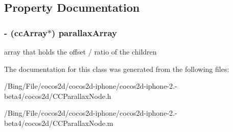 \subsection{Property Documentation}
\hypertarget{interface_c_c_parallax_node_ac06bed34e14b62be16a10fd9939eedc8}{
\subsubsection[{parallax\-Array}]{\setlength{\rightskip}{0pt plus 5cm}-\/ ({\bf cc\-Array}$\ast$) {\bf parallax\-Array}}}\label{interface_c_c_parallax_node_ac06bed34e14b62be16a10fd9939eedc8}
array that holds the offset / ratio of the children 

The documentation for this class was generated from the following files\-:\begin{DoxyCompactItemize}
\item 
/\-Bing/\-File/cocos2d/cocos2d-\/iphone/cocos2d-\/iphone-\/2.-\/beta4/cocos2d/C\-C\-Parallax\-Node.\-h\item 
/\-Bing/\-File/cocos2d/cocos2d-\/iphone/cocos2d-\/iphone-\/2.-\/beta4/cocos2d/C\-C\-Parallax\-Node.\-m\end{DoxyCompactItemize}
